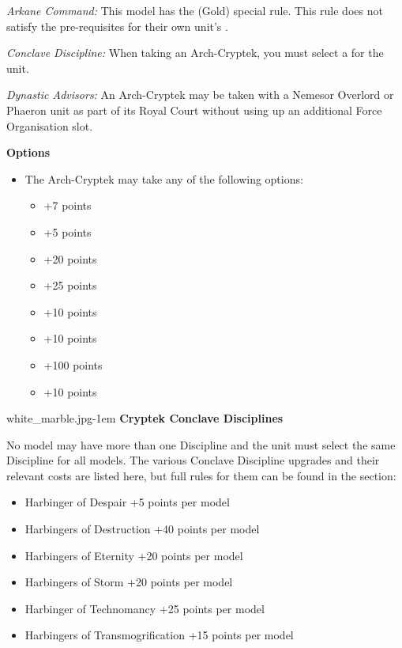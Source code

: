 \begin{minipage}[t]{0.72\textwidth}
	\textit{Arkane Command:} This model has the  (Gold) special rule. This rule does not satisfy the pre-requisites for their own unit's .
	
	\textit{Conclave Discipline:} When taking an Arch-Cryptek, you must select a  for the unit.
	
	\textit{Dynastic Advisors:} An Arch-Cryptek may be taken with a Nemesor Overlord or Phaeron unit as part of its Royal Court without using up an additional Force Organisation slot.
	
	\vspace*{2em}
	\textbf{Options}
	\begin{itemize}
		\item The Arch-Cryptek may take any of the following options:
		\begin{itemize}
			\item {} \dotfill +7 points
			\item {} \dotfill +5 points
			\item {} \dotfill +20 points
			\item {} \dotfill +25 points
			\item {} \dotfill +10 points
			\item {} \dotfill +10 points
			\item {} \dotfill +100 points
			\item {} \dotfill +10 points
		\end{itemize}
	\end{itemize}
	
	\vspace*{3em}
	\begin{imgminipage}{white_marble.jpg}{\textwidth-1em}
		\textbf{Cryptek Conclave Disciplines}
		
		No model may have more than one Discipline and the unit must select the same Discipline for all models. The various Conclave Discipline upgrades and their relevant costs are listed here, but full rules for them can be found in the  section:
		\begin{itemize}
			\item Harbinger of Despair \dotfill +5 points per model
			\item Harbingers of Destruction \dotfill +40 points per model
			\item Harbingers of Eternity \dotfill +20 points per model
			\item Harbingers of Storm \dotfill +20 points per model
			\item Harbinger of Technomancy \dotfill +25 points per model
			\item Harbingers of Transmogrification \dotfill +15 points per model
		\end{itemize}
	\end{imgminipage}
\end{minipage}



